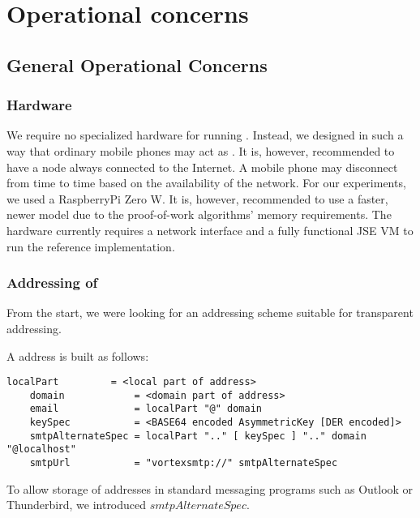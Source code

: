 \part{Operational concerns}\label{sec:operation}

\chapter{General Operational Concerns}
\section{Hardware}
We require no specialized hardware for running \VortexNodes. Instead, we designed \MessageVortex{} in such a way that ordinary mobile phones may act as \VortexNodes. It is, however, recommended to have a node always connected to the Internet. A mobile phone may disconnect from time to time based on the availability of the network. For our experiments, we used a RaspberryPi Zero W. It is, however, recommended to use a faster, newer model due to the proof-of-work algorithms' memory requirements. The hardware currently requires a network interface and a fully functional JSE VM to run the reference implementation.

\section{Addressing of \VortexNodes}
From the start, we were looking for an addressing scheme suitable for transparent addressing.

A \MessageVortex{} address is built as follows: 

\begin{lstlisting}[language=EBNF]
	localPart         = <local part of address>
	domain            = <domain part of address>
	email             = localPart "@" domain
	keySpec           = <BASE64 encoded AsymmetricKey [DER encoded]>
	smtpAlternateSpec = localPart ".." [ keySpec ] ".." domain "@localhost"
	smtpUrl           = "vortexsmtp://" smtpAlternateSpec
\end{lstlisting}

To allow storage of \MessageVortex{} addresses in standard messaging programs such as Outlook or Thunderbird, we introduced $smtpAlternateSpec$. 

